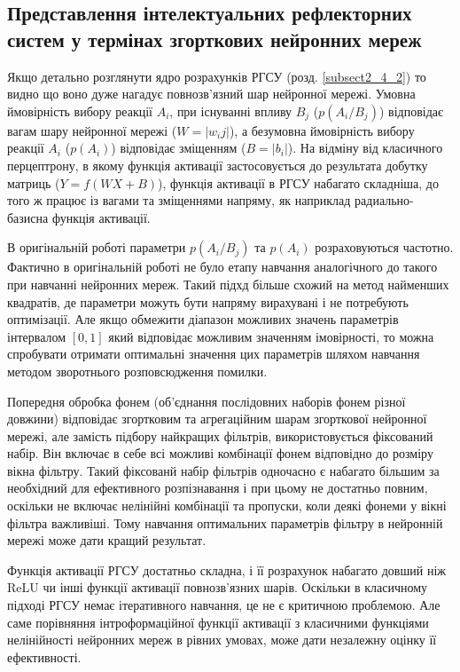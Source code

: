 \subsection{Представлення інтелектуальних рефлекторних систем у термінах згорткових нейронних мереж}

Якщо детально розглянути ядро розрахунків РГСУ (розд. \ref{subsect2_4_2}) то видно що воно дуже нагадує повнозв'язний шар нейронної мережі. Умовна ймовірність вибору реакції $A_i$, при існуванні впливу $B_j$ ($p(A_i/B_j)$) відповідає вагам шару нейронної мережі ($W = |w_ij|$), а безумовна ймовірність вибору реакції $A_i$ ($p(A_i)$) відповідає зміщенням ($B = |b_i|$). На відміну від класичного перцептрону, в якому функція активації застосовується до результата добутку матриць ($Y=f(WX + B)$), функція активації в РГСУ набагато складніша, до того ж працює із вагами та зміщеннями напряму, як наприклад радиально-базисна функція активації.

В оригінальній роботі параметри $p(A_i/B_j)$ та $p(A_i)$ розраховуються частотно. Фактично в оригінальній роботі не було етапу навчання аналогічного до такого при навчанні нейронних мереж. Такий підхд більше схожий на метод найменших квадратів, де параметри можуть бути напряму вирахувані і не потребують оптимізації.
Але якщо обмежити діапазон можливих значень параметрів інтервалом $[0, 1]$ який відповідає можливим значенням імовірності, то можна спробувати отримати оптимальні значення цих параметрів шляхом навчання методом зворотнього розповсюдження помилки.

Попередня обробка фонем (об'єднання послідовних наборів фонем різної довжини) відповідає згортковим та агрегаційним шарам згорткової нейронної мережі, але замість підбору найкращих фільтрів, використовується фіксований набір. Він включає в себе всі можливі комбінації фонем відповідно до розміру вікна фільтру. Такий фіксованй набір фільтрів одночасно є набагато більшим за необхідний для ефективного розпізнавання і при цьому не достатньо повним, оскільки не включає нелінійні комбінації та пропуски, коли деякі фонеми у вікні фільтра важливіші. Тому навчання оптимальних параметрів фільтру в нейронній мережі може дати кращий результат.

Функція активації РГСУ достатньо складна, і її розрахунок набагато довший ніж ReLU чи інші функції активації  повнозв'язних шарів. Оскільки в класичному підході РГСУ немає ітеративного навчання, це не є критичною проблемою. Але саме порівняння інтроформаційної функції активації з класичними функціями нелінійності нейронних мереж в рівних умовах, може дати незалежну оцінку її ефективності. 

